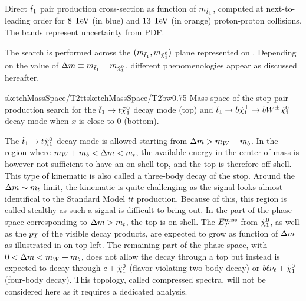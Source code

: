         {Direct $\tilde{t}_1$ pair production cross-section as function of $m_{\tilde{t}_1}$, computed at next-to-leading order
        for $8~\text{TeV}$ (in blue) and $13~\text{TeV}$ (in orange) proton-proton collisions. The bands represent uncertainty from PDF.}

        The search is performed across the $(m_{\tilde{t}_1},m_{\tilde{\chi}_1^0})$ plane
        represented on . Depending on the value of
        $\Delta m \equiv m_{\tilde{t}_1} - m_{\tilde{\chi}_1^0}$, different phenomenologies
        appear as discussed hereafter.

                     {sketchMassSpace/T2tt}{sketchMassSpace/T2bw}{0.75}
                     {Mass space of the stop pair production search for the $\tilde{t}_1
                     \rightarrow t \tilde{\chi}_1^0$ decay mode (top) and $\tilde{t}_1
                     \rightarrow b \tilde{\chi}_1^\pm \rightarrow b W^{\pm} \tilde{\chi}_1^0 $ decay
                     mode when $x$ is close to 0 (bottom).}

        The $\tilde{t}_1 \rightarrow t \tilde{\chi}_1^0$ decay mode is allowed starting from $\Delta m
        > m_{W} + m_{b}$. In the region where $m_{W} + m_{b} < \Delta m < m_{t}$,
        the available energy in the center of mass is however not sufficient to have an
        on-shell top, and the top is therefore off-shell. This type of kinematic is also
        called a three-body decay of the stop. Around the $\Delta m \sim m_{t}$ limit,
        the kinematic is quite challenging as the signal looks almost identifical to
        the Standard Model $t\bar{t}$ production. Because of this, this region is called
        stealthy as such a signal is difficult to bring out. In the part of the phase space
        corresponding to $\Delta m > m_{t}$, the top is on-shell. The $E_T^\text{miss}$ from $\tilde{\chi}_1^0$,
        as well as the $p_T$ of the visible decay products, are expected to grow as function of
        $\Delta m$ as illustrated in  on top left. The remaining
        part of the phase space, with $0 < \Delta m < m_{W} + m_{b}$, does not allow
        the decay through a top but instead is expected to decay through $c+\tilde{\chi}_1^0$
        (flavor-violating two-body decay) or $b\ell\nu_\ell+\tilde{\chi}_1^0$ (four-body decay).
        This topology, called compressed spectra, will not be considered here as it requires
        a dedicated analysis.

